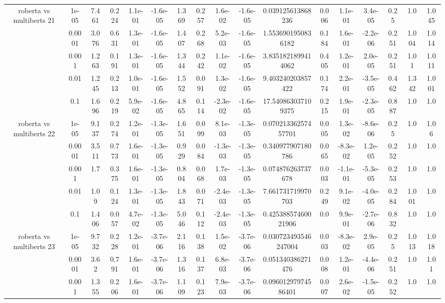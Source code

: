 \begin{tabular}{|c|c|c|c|c|c|c|c|c|c|c|c|c|c|c|c|c|}
\hline
\multirow{5}{*}{roberta  vs multiberts 21} & 1e-05 & 7.461 & 0.224 & 1.1e-01 & -1.6e-05 & 1.369 & 0.257 & 1.6e-02 & -1.6e-05 & 0.039125613868236 & 0.006 & 1.1e-01 & 3.4e-05 & 0.25 & 1.0 & 1.045 \\
 & 0.0001 & 3.076 & 0.631 & 1.3e-01 & -1.6e-05 & 1.407 & 0.268 & 5.2e-03 & -1.6e-05 & 1.5536901950836182 & 0.184 & 1.6e-01 & -2.2e-06 & 0.251 & 1.004 & 1.014 \\
 & 0.001 & 1.263 & 0.191 & 1.3e-01 & -1.6e-05 & 1.344 & 0.242 & 1.1e-02 & -1.6e-05 & 3.8351821899414062 & 0.405 & 1.2e-01 & 2.0e-05 & 0.251 & 1.01 & 1.011 \\
 & 0.01 & 1.245 & 0.213 & 1.0e-01 & -1.6e-05 & 1.552 & 0.091 & 1.3e-02 & -1.6e-05 & 9.403240203857422 & 0.174 & 2.2e-01 & -3.5e-05 & 0.462 & 1.342 & 1.001 \\
 & 0.1 & 1.696 & 0.219 & 5.9e-02 & -1.6e-05 & 4.865 & 0.114 & -2.3e-02 & -1.6e-05 & 17.540863037109375 & 0.215 & 1.9e-01 & -2.3e-05 & 0.887 & 1.0 & 1.0 \\
\hline
\multirow{5}{*}{roberta  vs multiberts 22} & 1e-05 & 9.137 & 0.274 & 1.2e-01 & -1.3e-05 & 1.651 & 0.099 & 8.1e-03 & -1.3e-05 & 0.07021336257457701 & 0.005 & 1.3e-02 & -8.6e-06 & 0.25 & 1.0 & 1.06 \\
 & 0.0001 & 3.511 & 0.773 & 1.6e-01 & -1.3e-05 & 0.929 & 0.084 & -1.3e-03 & -1.3e-05 & 0.340977907180786 & 0.065 & -8.3e-02 & 1.2e-05 & 0.252 & 1.0 & 1.0 \\
 & 0.001 & 1.7 & 0.375 & 1.6e-01 & -1.3e-05 & 0.804 & 0.068 & 1.7e-03 & -1.3e-05 & 0.074876263737678 & 0.003 & -1.1e-01 & -5.3e-05 & 0.253 & 1.0 & 1.0 \\
 & 0.01 & 1.09 & 0.124 & 1.3e-01 & -1.3e-05 & 1.843 & 0.071 & -2.4e-03 & -1.3e-05 & 7.661731719970703 & 0.249 & 9.1e-02 & -4.0e-05 & 0.284 & 1.001 & 1.0 \\
 & 0.1 & 1.406 & 0.057 & 4.7e-02 & -1.3e-05 & 5.046 & 0.112 & -2.4e-03 & -1.3e-05 & 0.42538857460021906 & 0.0 & 9.9e-01 & -2.7e-06 & 0.832 & 1.0 & 1.0 \\
\hline
\multirow{5}{*}{roberta  vs multiberts 23} & 1e-05 & 9.732 & 0.228 & 1.2e-01 & -3.7e-06 & 2.116 & 0.138 & 1.5e-02 & -3.7e-06 & 0.030723493546247004 & 0.003 & -8.3e-02 & 2.9e-05 & 0.25 & 1.013 & 1.018 \\
 & 0.0001 & 3.62 & 0.791 & 1.6e-01 & -3.7e-06 & 1.316 & 0.137 & 6.8e-03 & -3.7e-06 & 0.051340386271476 & 0.008 & 1.2e-01 & -4.4e-06 & 0.251 & 1.0 & 1.01 \\
 & 0.001 & 1.355 & 0.206 & 1.6e-01 & -3.7e-06 & 1.109 & 0.123 & 7.9e-03 & -3.7e-06 & 0.09601297974586401 & 0.007 & 2.6e-02 & -1.5e-05 & 0.252 & 1.0 & 1.0 \\

\end{tabular}
